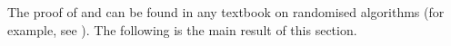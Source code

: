 \documentclass[11pt]{article}
\providecommand{\DIFdelbegin}{} %
\begin{document}


The proof of  and 
can be found in any textbook on randomised algorithms (for example, see \citep[Chapter 1, Chapter 7]{mitzenmacher2017probability}). The following is the main result of this section. 
\DIFdelbegin %
\end{document}
